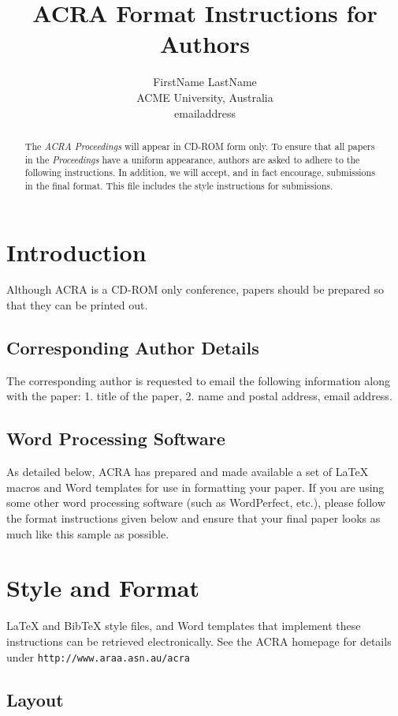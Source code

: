 \documentclass{article}
\title{ACRA Format Instructions for Authors}
\author{FirstName LastName \\ ACME University, Australia \\ 
emailaddress}
\begin{document}
\maketitle

\begin{abstract}
The {\it ACRA Proceedings} will appear in CD-ROM form only.
To ensure that all papers in the {\it Proceedings} have a
uniform appearance, authors are asked to adhere to the following
instructions. In addition, we will accept, and in fact encourage, 
submissions in the final format. This file includes the style instructions 
for submissions.
\end{abstract}

\section{Introduction}

Although ACRA is a CD-ROM only conference, papers should be prepared so that
they can be printed out. 

\subsection{Corresponding Author Details} 
The corresponding author is requested to email the following
information along with the paper: 1. title of the paper, 
2. name and postal address, email address.

\subsection{Word Processing Software}

As detailed below, ACRA has prepared and made available a set of
\LaTeX{} macros and Word templates for use in formatting your paper.
If you are using some other word processing software (such as
WordPerfect, etc.), please follow the format instructions given below
and ensure that your final paper looks as much like this sample as
possible.

\section{Style and Format}

\LaTeX{} and Bib\TeX{} style files, and Word templates that implement these 
instructions can be retrieved electronically.  See the ACRA homepage for 
details under
\verb+http://www.araa.asn.au/acra+

\subsection{Layout}
\end{document}
